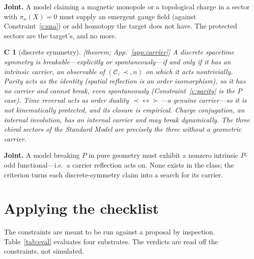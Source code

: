 \documentclass[aps,prd,reprint,nofootinbib,superscriptaddress,floatfix]{revtex4-2}
\newtheorem{constraint}{C}
\begin{document}
\noindent\textbf{Joint.} A model claiming a magnetic monopole or a topological charge in a
sector with $\pi_n(X)=0$ must supply an emergent gauge field (against Constraint~\ref{c:sna})
or add homotopy the target does not have. The protected sectors are the target's, and no more.

\begin{constraint}[discrete symmetry]
\label{c:carrier}
{\rm[theorem; App.~\ref{app:carrier}]} A discrete spacetime symmetry is breakable---explicitly or
spontaneously---if and only if it has an intrinsic \emph{carrier}, an observable of
$(\mathcal C,\prec,n)$ on which it acts nontrivially. Parity acts as the identity (spatial
reflection is an order isomorphism), so it has no carrier and cannot break, even spontaneously
(Constraint~\ref{c:parity} is the $P$ case). Time reversal acts as order duality
$\prec\leftrightarrow\succ$---a genuine carrier---so it is not kinematically protected, and its
closure is empirical. Charge conjugation, an internal involution, has an internal carrier and may
break dynamically. The three chiral sectors of the Standard Model are precisely the three without
a geometric carrier.
\end{constraint}

\noindent\textbf{Joint.} A model breaking $P$ in pure geometry must exhibit a nonzero intrinsic
$P$-odd functional---i.e.\ a carrier reflection acts on. None exists in the class; the criterion
turns each discrete-symmetry claim into a search for its carrier.

\section{Applying the checklist}
\label{sec:apply}

The constraints are meant to be run against a proposal by inspection. Table~\ref{tab:eval}
evaluates four substrates. The verdicts are read off the constraints, not simulated.
\end{document}
